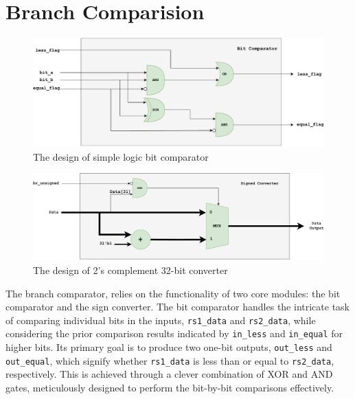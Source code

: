 \documentclass[12pt,a4paper,oneside]{book} %
\begin{document}
\section{Branch Comparision}
 \begin{figure}[H]
    \begin{center}
    \includegraphics[trim=0cm 0cm 0cm 0cm,clip,width=.90\textwidth]{images/milestone2-bitcomp.drawio-1.pdf}
    \caption{The design of simple logic bit comparator}
    \end{center}
\end{figure}

 \begin{figure}[H]
    \begin{center}
    \includegraphics[trim=0cm 0cm 0cm 0cm,clip,width=.90\textwidth]{images/milestone2-signcvter.drawio.pdf}
    \caption{The design of  2’s complement 32-bit converter}
    \end{center}
\end{figure}

The branch comparator, relies on the functionality of two core modules: the bit comparator and the sign converter. The bit comparator handles the intricate task of comparing individual bits in the inputs, \texttt{rs1\_data} and \texttt{rs2\_data}, while considering the prior comparison results indicated by \texttt{in\_less} and \texttt{in\_equal} for higher bits. Its primary goal is to produce two one-bit outputs, \texttt{out\_less} and \texttt{out\_equal}, which signify whether \texttt{rs1\_data} is less than or equal to \texttt{rs2\_data}, respectively. This is achieved through a clever combination of XOR and AND gates, meticulously designed to perform the bit-by-bit comparisons effectively.
\end{document}
